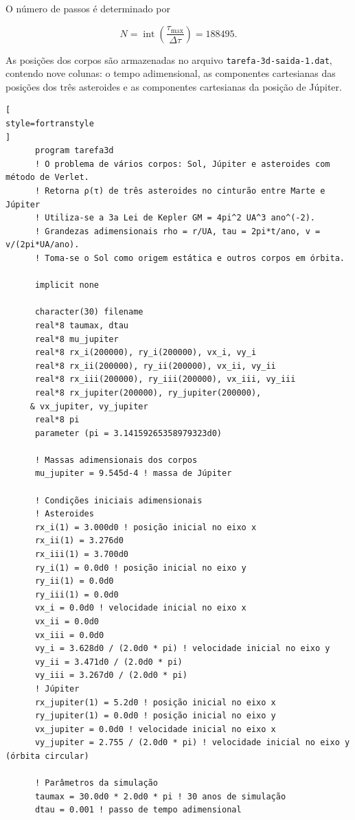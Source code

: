 \documentclass[12pt,a4paper]{article}
\begin{document}
O número de passos é determinado por

\begin{equation}
    N=\operatorname{int}
    \left(\frac{\tau_{\max}}{\Delta\tau}\right)
    =188495.
\end{equation}

As posições dos corpos são armazenadas no arquivo \texttt{tarefa-3d-saida-1.dat}, contendo nove colunas: o tempo adimensional, as componentes cartesianas das posições dos três asteroides e as componentes cartesianas da posição de Júpiter.

\begin{lstlisting}[
style=fortranstyle
]
      program tarefa3d
      ! O problema de vários corpos: Sol, Júpiter e asteroides com método de Verlet.
      ! Retorna ρ(τ) de três asteroides no cinturão entre Marte e Júpiter
      ! Utiliza-se a 3a Lei de Kepler GM = 4pi^2 UA^3 ano^(-2).
      ! Grandezas adimensionais rho = r/UA, tau = 2pi*t/ano, v = v/(2pi*UA/ano).
      ! Toma-se o Sol como origem estática e outros corpos em órbita.

      implicit none

      character(30) filename
      real*8 taumax, dtau
      real*8 mu_jupiter
      real*8 rx_i(200000), ry_i(200000), vx_i, vy_i
      real*8 rx_ii(200000), ry_ii(200000), vx_ii, vy_ii
      real*8 rx_iii(200000), ry_iii(200000), vx_iii, vy_iii
      real*8 rx_jupiter(200000), ry_jupiter(200000), 
     & vx_jupiter, vy_jupiter
      real*8 pi
      parameter (pi = 3.14159265358979323d0)

      ! Massas adimensionais dos corpos
      mu_jupiter = 9.545d-4 ! massa de Júpiter

      ! Condições iniciais adimensionais
      ! Asteroides
      rx_i(1) = 3.000d0 ! posição inicial no eixo x
      rx_ii(1) = 3.276d0
      rx_iii(1) = 3.700d0
      ry_i(1) = 0.0d0 ! posição inicial no eixo y
      ry_ii(1) = 0.0d0
      ry_iii(1) = 0.0d0
      vx_i = 0.0d0 ! velocidade inicial no eixo x
      vx_ii = 0.0d0
      vx_iii = 0.0d0
      vy_i = 3.628d0 / (2.0d0 * pi) ! velocidade inicial no eixo y
      vy_ii = 3.471d0 / (2.0d0 * pi)
      vy_iii = 3.267d0 / (2.0d0 * pi)
      ! Júpiter
      rx_jupiter(1) = 5.2d0 ! posição inicial no eixo x
      ry_jupiter(1) = 0.0d0 ! posição inicial no eixo y
      vx_jupiter = 0.0d0 ! velocidade inicial no eixo x
      vy_jupiter = 2.755 / (2.0d0 * pi) ! velocidade inicial no eixo y (órbita circular)

      ! Parâmetros da simulação
      taumax = 30.0d0 * 2.0d0 * pi ! 30 anos de simulação
      dtau = 0.001 ! passo de tempo adimensional


\end{lstlisting}
\end{document}
